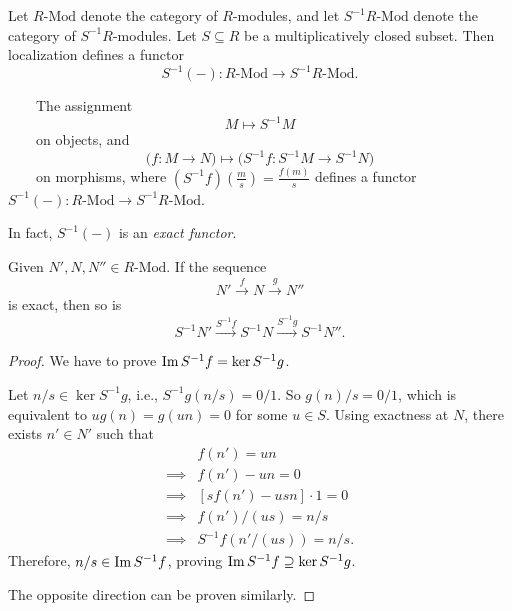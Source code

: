 Let \(R\text{-}\mathrm{Mod}\) denote the category of \(R\)-modules, and let
\(S^{-1}R\text{-}\mathrm{Mod}\) denote the category of \(S^{-1}R\)-modules.
Let \(S \subseteq R\) be a multiplicatively closed subset. Then localization
defines a functor
\[
    S^{-1}(-) : R\text{-}\mathrm{Mod} \longrightarrow S^{-1}R\text{-}\mathrm{Mod}.
\]
\begin{remark}
    The assignment
    \[
        M \longmapsto S^{-1}M
    \]
    on objects, and
    \[
        \bigl(f:M\to N\bigr) \mapsto\bigl(S^{-1}f:S^{-1}M\to S^{-1}N\bigr)
    \]
    on morphisms, where \( (S^{-1}f)\left(\frac{m}{s}\right) = \frac{f(m)}{s} \) defines a functor \( S^{-1}(-):R\text{-}\mathrm{Mod} \to S^{-1}R\text{-}\mathrm{Mod} \).
\end{remark}
In fact, \( S^{-1}(-) \) is an \emph{exact functor}. 
\begin{proposition}
    Given \( N', N, N'' \in R\text{-Mod}\). If the sequence
     \[
         N' \xrightarrow{f} N \xrightarrow{g} N'' 
    \]
    is exact, then so is
    \[
        S^{-1}N' \xrightarrow{S^{-1}f} S^{-1}N \xrightarrow{S^{-1}g} S^{-1}N''.
    \] 
\end{proposition}
\begin{proof}
    We have to prove \( \operatorname{Im} S^{-1}f = \ker S^{-1}g \).

    Let \( n / s \in \ker S^{-1}g \), i.e., \( S^{-1}g(n / s) = 0 / 1 \). So  \( g(n) / s = 0 / 1\), which is equivalent to \( ug(n) = g(un) = 0 \) for some \( u \in S \). Using exactness at  \( N \), there exists  \( n' \in N' \) such that
    \begin{align*}
      &f(n') = un\\
      \implies &f(n') - un = 0\\
      \implies &[s f(n') - usn] \cdot 1 = 0\\
      \implies &f(n') / (us) = n / s\\
      \implies &S^{-1}f(n' / (us)) = n / s
    .\end{align*}
    Therefore, \( n / s \in \operatorname{Im} S^{-1}f \), proving \( \operatorname{Im} S^{-1}f \supseteq \ker S^{-1}g \).

    The opposite direction can be proven similarly.
\end{proof}
